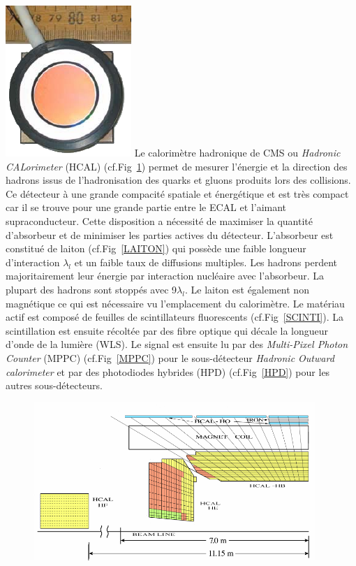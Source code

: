 \marginpar
{
	\centering
	\includegraphics[width=\marginparwidth]{CMS/HPD.png}
	\label{HPD}
}
Le calorimètre hadronique de CMS ou \textit{Hadronic CALorimeter} (HCAL) (cf.Fig~\ref{HCAL}) permet de mesurer l'énergie et la direction des hadrons issus de l'hadronisation des quarks et gluons produits lors des collisions. Ce détecteur à une grande compacité spatiale et énergétique et est très compact car il se trouve pour une grande partie entre le ECAL et l'aimant supraconducteur. Cette disposition a nécessité de maximiser la quantité d'absorbeur et de minimiser les parties actives du détecteur. L'absorbeur est constitué de laiton (cf.Fig~\ref{LAITON}) qui possède une faible longueur d'interaction $\lambda_{l}$ et un faible taux de diffusions multiples. Les hadrons perdent majoritairement leur énergie par interaction nucléaire avec l'absorbeur. La plupart des hadrons sont stoppés avec \num{9}$\lambda_{l}$. Le laiton est également non magnétique ce qui est nécessaire vu l'emplacement du calorimètre. Le matériau actif est composé de feuilles de scintillateurs fluorescents (cf.Fig~\ref{SCINTI}). La scintillation est ensuite récoltée par des fibre optique qui décale la longueur d'onde de la lumière (WLS). Le signal est ensuite lu par des \textit{Multi-Pixel Photon Counter} (MPPC) (cf.Fig~\ref{MPPC}) pour le sous-détecteur \textit{Hadronic Outward calorimeter} et par des photodiodes hybrides (HPD) (cf.Fig~\ref{HPD}) pour les autres sous-détecteurs.
\begin{figure}[ht!]
	\centering
	\includegraphics[width=0.95\textwidth]{CMS/HCALSCHEME.png}
	\label{HCAL}
\end{figure}

